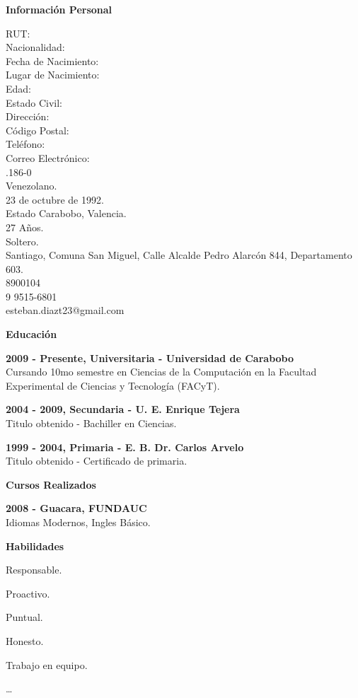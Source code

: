 \documentclass[a4paper,12pt,final]{memoir}
\newcommand{\Sep}{\vspace{1.5em}}
\newcommand{\SmallSep}{\vspace{0.5em}}
\newcommand{\CVSection}[1]
	{\Large\textbf{#1}\par
	\SmallSep\normalsize\normalfont}
\newcommand{\CVItem}[1]
	{\textbf{\color{RoyalBlue} #1}}
\begin{document}
\CVSection{Información Personal}
\begin{multicols}{2}
RUT: \\
Nacionalidad: \\
Fecha de Nacimiento: \\
Lugar de Nacimiento: \\
Edad: \\
Estado Civil: \\
Dirección: \\
\newline
\newline
Código Postal: \\
Teléfono: \\
Correo Electrónico: \\
\vfill
{}.186-0\\
Venezolano.\\
23 de octubre de 1992.\\
Estado Carabobo, Valencia. \\
27 Años.\\
Soltero.\\
Santiago, Comuna San Miguel, Calle Alcalde Pedro Alarcón 844, Departamento 603.\\
8900104 \\
9 9515-6801 \\
esteban.diazt23@gmail.com
\end{multicols}
\Sep
\CVSection{Educación}
\CVItem{2009 - Presente, Universitaria - Universidad de Carabobo}\\
Cursando 10mo semestre en Ciencias de la Computación en la Facultad Experimental
de Ciencias y Tecnología (FACyT).
\SmallSep

\CVItem{2004 - 2009, Secundaria - U. E. Enrique Tejera}\\
Titulo obtenido - Bachiller en Ciencias.
\SmallSep

\CVItem{1999 - 2004, Primaria - E. B. Dr. Carlos Arvelo}\\
Titulo obtenido - Certificado de primaria.

\Sep

\CVSection{Cursos Realizados}
\CVItem{2008 - Guacara, FUNDAUC}\\
Idiomas Modernos, Ingles Básico.
\Sep


\CVSection{Habilidades}
\begin{multicols}{3}
\begin{compactitem}[\color{RoyalBlue}$\circ$]
	\item Responsable.
	\item Proactivo. 
	\item Puntual.
	\item Honesto.
	\item Trabajo en equipo.
	\item \dots
\end{compactitem}
\end{multicols}
\SmallSep
\end{document}
